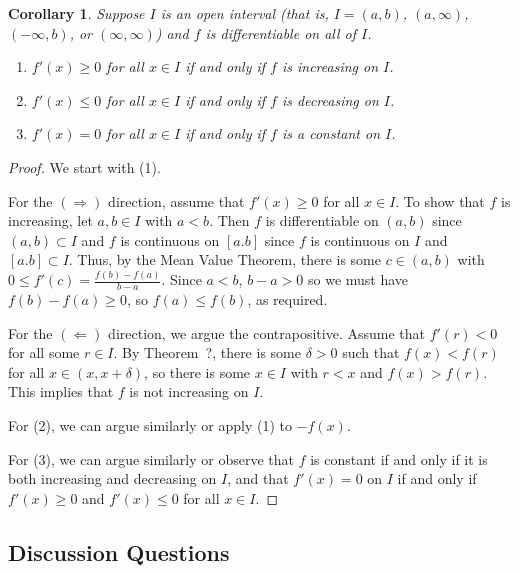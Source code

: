\documentclass[12pt]{amsart}
\def\d{\delta}
\numberwithin{equation}{section}
\theoremstyle{plain} %
\newtheorem{cor}[equation]{Corollary}
\theoremstyle{definition}
\theoremstyle{remark}
\begin{document}
\begin{cor}
Suppose $I$ is an open interval (that is, $I = (a,b)$, $(a, \infty)$, $(-\infty, b)$, or $(\infty, \infty)$) and $f$ is differentiable on all of $I$.  
\begin{enumerate}
\item $f'(x) \geq 0$ for all $x \in I$ if and only if $f$ is increasing on $I$.
\item $f'(x) \leq 0$ for all $x \in I$ if and only if $f$ is decreasing on $I$.
\item $f'(x) = 0$ for all $x \in I$ if and only if $f$ is a constant on $I$. 
\end{enumerate}
\end{cor}
\begin{proof}
We start with (1). 

For the $(\Rightarrow)$ direction, assume that $f'(x)\geq 0$ for all $x\in I$. To show that $f$ is increasing, let $a,b\in I$ with $a<b$. Then $f$ is differentiable on $(a,b)$ since $(a,b)\subset I$ and $f$ is continuous on $[a.b]$ since $f$ is continuous on $I$ and $[a.b]\subset I$. Thus, by the Mean Value Theorem, there is some $c\in (a,b)$ with $0 \leq f'(c) = \frac{f(b) - f(a)}{b-a}$. Since $a<b$, $b-a>0$ so we must have $f(b)-f(a)\geq 0$, so $f(a)\leq f(b)$, as required.

For the $(\Leftarrow)$ direction, we argue the contrapositive. Assume that $f'(r) < 0$ for all some $r\in I$. By Theorem~?, there is some $\delta>0$ such that $f(x) < f(r)$ for all $x\in (x,x+\d)$, so there is some $x\in I$ with $r<x$ and $f(x) > f(r)$. This implies that $f$ is not increasing on $I$.

For (2), we can argue similarly or apply (1) to $-f(x)$.

For (3), we can argue similarly or observe that $f$ is constant if and only if it is both increasing and decreasing on $I$, and that $f'(x) = 0$ on $I$ if and only if $f'(x)\geq 0$ and $f'(x)\leq 0$ for all $x\in I$.
\end{proof}
 
 
 \subsection*{Discussion Questions}
 
\end{document}

